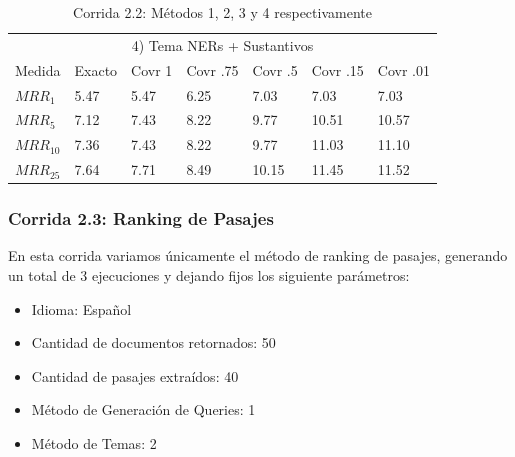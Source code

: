 \begin{frame}
\begin{table}
\begin{center}
\medskip

\begin{tabular}{|l | l | l | l | l | l | l |}

\multicolumn{7}{|c|}{4) Tema NERs + Sustantivos}  \\ 
Medida & Exacto & Covr 1 & Covr .75 & Covr .5 & Covr .15 & Covr .01 \\ 
$MRR_{1}$ & 5.47 & 5.47 & 6.25 & 7.03 & 7.03 & 7.03  \\ 
$MRR_{5}$ & 7.12 & 7.43 & 8.22 & 9.77 & 10.51 & 10.57  \\ 
$MRR_{10}$ & 7.36 & 7.43 & 8.22 & 9.77 & 11.03 & 11.10  \\ 
$MRR_{25}$ & 7.64 & 7.71 & 8.49 & 10.15 & 11.45 & 11.52  \\ 
\end{tabular}


\caption{Corrida 2.2: Métodos 1, 2, 3 y 4 respectivamente}
\label{table:2_2_40_getExactMRRWikiFactoid_getCovrMRRWikiFactoidy}
\end{center}
\end{table}
\end{frame}















\begin{frame}
\frametitle{Corrida 2.3: Ranking de Pasajes}



En esta corrida variamos únicamente el método de ranking de pasajes, generando un total de 3 ejecuciones y dejando fijos los siguiente parámetros:


\begin{itemize}
  \item Idioma: Español
  \item Cantidad de documentos retornados: 50
  \item Cantidad de pasajes extraídos: 40
  \item Método de Generación de Queries: 1
  \item Método de Temas: 2
\end{itemize}
\end{frame}




